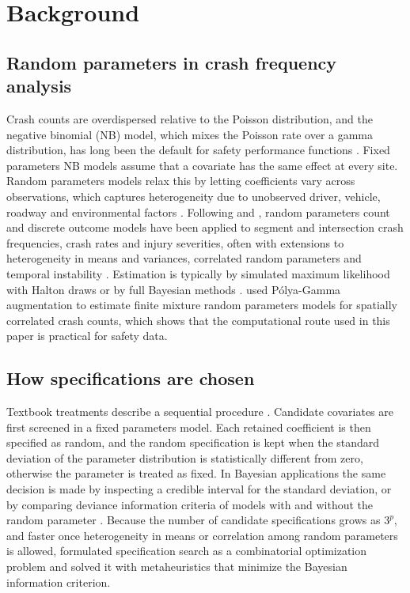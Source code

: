 \section{Background}\label{sec:background}

\subsection{Random parameters in crash frequency analysis}

Crash counts are overdispersed relative to the Poisson distribution, and the negative binomial (NB) model, which mixes the Poisson rate over a gamma distribution, has long been the default for safety performance functions \citep{lord2010statistical}. Fixed parameters NB models assume that a covariate has the same effect at every site. Random parameters models relax this by letting coefficients vary across observations, which captures heterogeneity due to unobserved driver, vehicle, roadway and environmental factors \citep{mannering2016unobserved}. Following \citet{anastasopoulos2009note} and \citet{milton2008highway}, random parameters count and discrete outcome models have been applied to segment and intersection crash frequencies, crash rates and injury severities, often with extensions to heterogeneity in means and variances, correlated random parameters and temporal instability \citep{mannering2014analytic, mannering2018temporal}. Estimation is typically by simulated maximum likelihood with Halton draws \citep{bhat2003simulation, train2009discrete} or by full Bayesian methods \citep{elbasyouny2009accident}. \citet{buddhavarapu2016modeling} used P\'olya-Gamma augmentation to estimate finite mixture random parameters models for spatially correlated crash counts, which shows that the computational route used in this paper is practical for safety data.

\subsection{How specifications are chosen}

Textbook treatments describe a sequential procedure \citep{washington2020statistical}. Candidate covariates are first screened in a fixed parameters model. Each retained coefficient is then specified as random, and the random specification is kept when the standard deviation of the parameter distribution is statistically different from zero, otherwise the parameter is treated as fixed. In Bayesian applications the same decision is made by inspecting a credible interval for the standard deviation, or by comparing deviance information criteria of models with and without the random parameter \citep[e.g.,][]{zeng2017multivariate}. Because the number of candidate specifications grows as $3^p$, and faster once heterogeneity in means or correlation among random parameters is allowed, \citet{ahern2024extensive} formulated specification search as a combinatorial optimization problem and solved it with metaheuristics that minimize the Bayesian information criterion.

